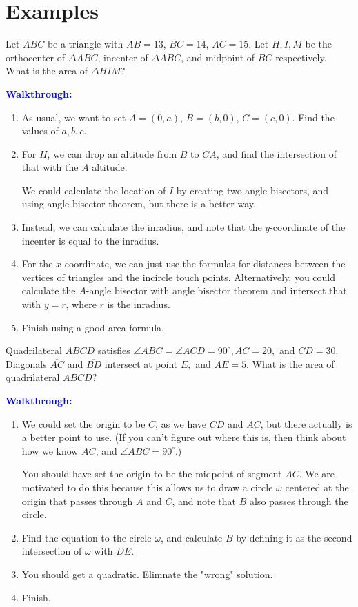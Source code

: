\documentclass{article}
\begin{document}
\section{Examples}
\begin{exam}[No Source]
Let $ABC$ be a triangle with $AB=13$, $BC=14$, $AC=15$. Let $H,I,M$ be the orthocenter of $\Delta ABC$, incenter of $\Delta ABC$, and midpoint of $BC$ respectively. What is the area of $\Delta HIM$?
\end{exam}
\textcolor{Blue}{\textbf{Walkthrough:}}
\begin{enumerate}[label=(\alph*)]
    \item As usual, we want to set $A=(0,a)$, $B=(b,0)$, $C=(c,0)$. Find the values of $a,b,c$. 
    \item For $H$, we can drop an altitude from $B$ to $CA$, and find the intersection of that with the $A$ altitude.
    
    We could calculate the location of $I$ by creating two angle bisectors, and using angle bisector theorem, but there is a better way. 

    \item Instead, we can calculate the inradius, and note that the $y$-coordinate of the incenter is equal to the inradius.
    \item For the $x$-coordinate, we can just use the formulas for distances between the vertices of triangles and the incircle touch points. Alternatively, you could calculate the $A$-angle bisector with angle bisector theorem and intersect that with $y=r$, where $r$ is the inradius.
    \item Finish using a good area formula. 
\end{enumerate}

\begin{exam}
Quadrilateral $ABCD$ satisfies $\angle ABC = \angle ACD = 90^{\circ}, AC=20,$ and $CD=30.$ Diagonals $\overline{AC}$ and $\overline{BD}$ intersect at point $E,$ and $AE=5.$ What is the area of quadrilateral $ABCD?$
\end{exam}
\textcolor{Blue}{\textbf{Walkthrough:}}
\begin{enumerate}[label=(\alph*)]
    \item We could set the origin to be $C$, as we have $CD$ and $AC$, but there actually is a better point to use. (If you can't figure out where this is, then think about how we know $AC$, and $\angle ABC=90^{\circ}$.)
    
    You should have set the origin to be the midpoint of segment $AC$. We are motivated to do this because this allows us to draw a circle $\omega$ centered at the origin that passes through $A$ and $C$, and note that $B$ also passes through the circle.
    
    \item Find the equation to the circle $\omega$, and calculate $B$ by defining it as the second intersection of $\omega$ with $DE$. 
    \item You should get a quadratic. Elimnate the "wrong" solution.
    \item Finish. 
\end{enumerate}
\end{document}
